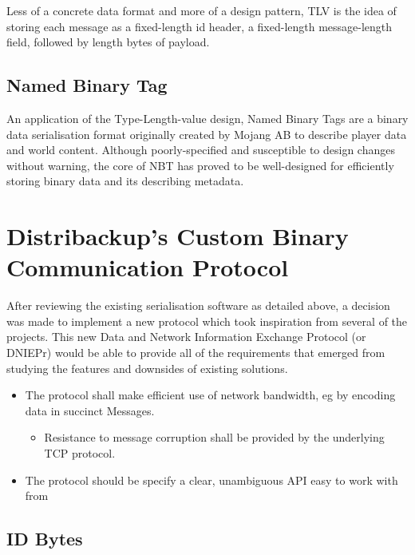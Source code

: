 \documentclass[12pt,a4paper,]{adreport}
\begin{document}
Less of a concrete data format and more of a design pattern, TLV is the
idea of storing each message as a fixed-length id header, a fixed-length
message-length field, followed by length bytes of payload.

\subsection{Named Binary Tag}\label{named-binary-tag}

An application of the Type-Length-value design, Named Binary Tags are a
binary data serialisation format originally created by Mojang AB to
describe player data and world content. Although poorly-specified and
susceptible to design changes without warning, the core of NBT has
proved to be well-designed for efficiently storing binary data and its
describing metadata.

\section{Distribackup's Custom Binary Communication
Protocol}\label{distribackups-custom-binary-communication-protocol}

After reviewing the existing serialisation software as detailed above, a
decision was made to implement a new protocol which took inspiration
from several of the projects. This new Data and Network Information
Exchange Protocol (or DNIEPr) would be able to provide all of the
requirements that emerged from studying the features and downsides of
existing solutions.

\begin{itemize}
\itemsep1pt\parskip0pt
\item
  The protocol shall make efficient use of network bandwidth, eg by
  encoding data in succinct Messages.

  \begin{itemize}
  \itemsep1pt\parskip0pt
  \item
    Resistance to message corruption shall be provided by the underlying
    TCP protocol.
  \end{itemize}
\item
  The protocol should be specify a clear, unambiguous API easy to work
  with from
\end{itemize}

\subsection{ID Bytes}\label{id-bytes}
\end{document}
